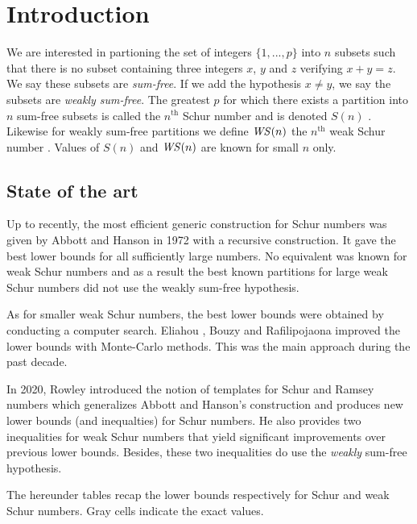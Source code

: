 \section{Introduction}

\qquad We are interested in partioning the set of integers \(\{1, ..., p\}\) into \(n\) subsets such that there is no 
subset containing three integers \(x\), \(y\) and \(z\) verifying \(x + y = z\). We say these subsets are 
\textit{sum-free}. If we add the hypothesis \(x \neq y\), we say the subsets are \textit{weakly sum-free}. The 
greatest \(p\) for which there exists a partition into \(n\) sum-free subsets is called the \(n^{\text{th}}\) Schur 
number and is denoted \(S(n)\) \cite{Schur1917}. Likewise for weakly sum-free partitions we define \(\mathit{WS}(n)\) 
the \(n^{\text{th}}\) weak Schur number \cite{Irving1973}. Values of \(S(n)\) and \(\mathit{WS}(n)\) are known for small \(n\) only.


\subsection{State of the art}

\qquad Up to recently, the most efficient generic construction for Schur numbers was given by Abbott and Hanson 
\cite{AbbottHanson} in 1972 with a recursive construction. It gave the best lower bounds for all sufficiently large 
numbers. No equivalent was known for weak Schur numbers and as a result the best known partitions for large 
weak Schur numbers did not use the weakly sum-free hypothesis. 

\par
As for smaller weak Schur numbers, the best lower bounds were obtained by conducting a computer search. Eliahou 
\cite{EliahouBook}, Bouzy \cite{Bouzy2015AnAP} and Rafilipojaona \cite{Rafilipojaona} improved the lower 
bounds with Monte-Carlo methods. This was the main approach during the past decade.

\par
In 2020, Rowley introduced the notion of templates for Schur and Ramsey numbers \cite{RowleyRamsey} which 
generalizes Abbott and Hanson's construction and produces new lower bounds (and inequalties) for Schur numbers. 
He also provides two inequalities for weak Schur numbers \cite{RowleyWS} that yield significant improvements 
over previous lower bounds. Besides, these two inequalities do use the \textit{weakly} sum-free hypothesis.

\par The hereunder tables recap the lower bounds respectively for Schur and weak Schur numbers. Gray cells 
indicate the exact values.


